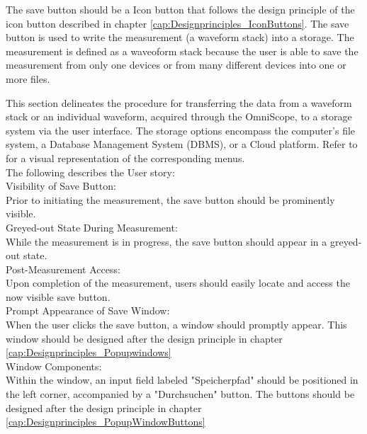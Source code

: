 \documentclass{scrreprt}
\begin{document}
The save button should be a Icon button that follows the design principle of the icon button described in chapter \ref{cap:Designprinciples_IconButtons}. 
The save button is used to write the measurement (a waveform stack) into a storage. 
The measurement is defined as a waveoform stack because the user is able to save the measurement from only one devices or from many different devices into one or more files.

This section delineates the procedure for transferring the data from a waveform stack or an individual waveform, acquired through the OmniScope, to a storage system via the user interface. The storage options encompass the computer's file system, a Database Management System (DBMS), or a Cloud platform. Refer to \cite{fig:saveData} for a visual representation of the corresponding menus.\\

The following describes the User story: \\

Visibility of Save Button: \\

Prior to initiating the measurement, the save button should be prominently visible.\\

Greyed-out State During Measurement:\\

While the measurement is in progress, the save button should appear in a greyed-out state.\\

Post-Measurement Access:\\

Upon completion of the measurement, users should easily locate and access the now visible save button.\\

Prompt Appearance of Save Window:\\

When the user clicks the save button, a window should promptly appear. This window should be designed after the design principle in chapter \ref{cap:Designprinciples_Popupwindows}\\

Window Components:\\

Within the window, an input field labeled "Speicherpfad" should be positioned in the left corner, accompanied by a "Durchsuchen" button. The buttons should be designed after the design principle in chapter \ref{cap:Designprinciples_PopupWindowButtons}\\
\end{document}
